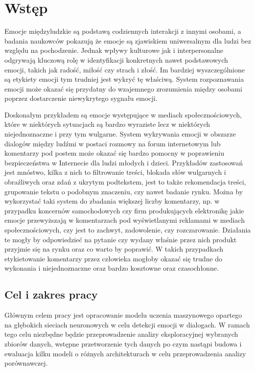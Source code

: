\chapter{Wstęp}

Emocje międzyludzkie są podstawą codziennych interakcji z innymi osobami, a badania naukowców pokazują że emocje są zjawiskiem uniwersalnym dla ludzi bez względu na pochodzenie. Jednak wpływy kulturowe jak i interpersonalne odgrywają kluczową rolę w identyfikacji konkretnych nawet podstawowych emocji, takich jak radość, miłość czy strach i złość. Im bardziej wyszczególnione są etykiety emocji tym trudniej jest wykryć tę właściwą. System rozpoznawania emocji może okazać się przydatny do wzajemnego zrozumienia między osobami poprzez dostarczenie niewykrytego sygnału emocji. 

Doskonałym przykładem są emocje występujące w mediach społecznościowych, które w niektórych sytuacjach są bardzo wyraziste lecz w niektórych niejednoznaczne i przy tym wulgarne. System wykrywania emocji w obszarze dialogów między ludźmi w postaci rozmowy na forum internetowym lub komentarzy pod postem może okazać się bardzo pomocny w poprawieniu bezpieczeństwa w Internecie dla ludzi młodych i dzieci. Przykładów zastosowań jest mnóstwo, kilka z nich to filtrowanie treści, blokada słów wulgarnych i obraźliwych oraz zdań z ukrytym podtekstem, jest to także rekomendacja treści, grupowanie tekstu o podobnym znaczeniu, czy nawet badanie rynku. Można by wykorzystać taki system do zbadania większej liczby komentarzy, np. w przypadku koncernów samochodowych czy firm produkujących elektronikę jakie emocje przewyższają w komentarzach pod wyświetlanymi reklamami w mediach społecznościowych, czy jest to zachwyt, zadowolenie, czy rozczarowanie. Działania te mogły by odpowiedzieć na pytanie czy wydany właśnie przez nich produkt przyjmie się na rynku oraz co warto by poprawić. W takich przypadkach etykietowanie komentarzy przez człowieka mogłoby okazać się trudne do wykonania i niejednoznaczne oraz bardzo kosztowne oraz czasochłonne.

\section{Cel i zakres pracy}

Głównym celem pracy jest opracowanie modelu uczenia maszynowego opartego na głębokich sieciach neuronowych w celu detekcji emocji w dialogach. W ramach tego celu niezbędne będzie przeprowadzenie analizy eksploracyjnej wybranych zbiorów danych, wstępne przetworzenie tych danych po czym nastąpi budowa i ewaluacja kilku modeli o różnych architekturach w celu przeprowadzenia analizy porównawczej.

